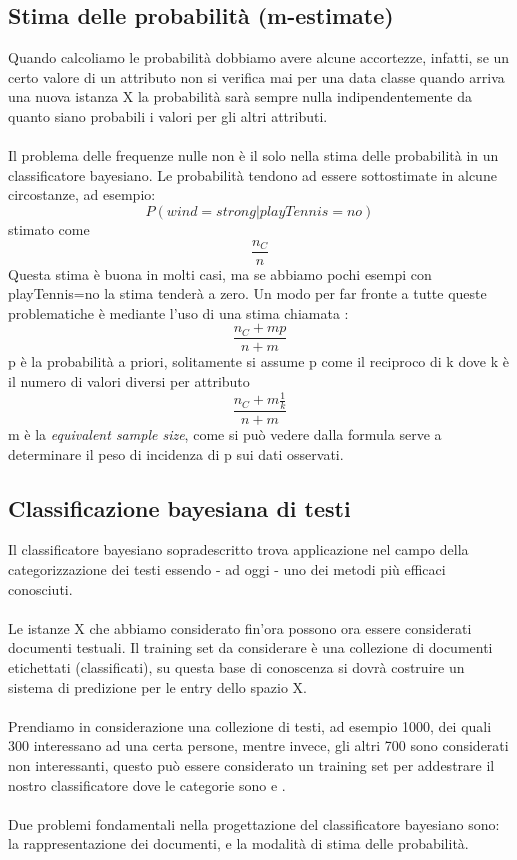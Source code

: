\documentclass{article}
\theoremstyle{plain}
\theoremstyle{definition}
\begin{document}
\subsection{Stima delle probabilità (m-estimate)}
Quando calcoliamo le probabilità dobbiamo avere alcune accortezze, infatti, se un certo valore di un attributo non si verifica mai per una data classe quando arriva una nuova istanza X la probabilità sarà sempre nulla indipendentemente da quanto siano probabili i valori per gli altri attributi. 
\\
\\
Il problema delle frequenze nulle non è il solo nella stima delle probabilità in un classificatore bayesiano. Le probabilità tendono ad essere sottostimate in alcune circostanze, ad esempio:
$$P(wind=strong|playTennis=no)$$ stimato come $$\frac{n_C}{n}$$
Questa stima è buona in molti casi, ma se abbiamo pochi esempi con playTennis=no la stima tenderà a zero.
Un modo per far fronte a tutte queste problematiche è mediante l'uso di una stima chiamata :
$$\frac{n_C+mp}{n+m}$$
p è la probabilità a priori, solitamente si assume p come il reciproco di k dove k è il numero di valori diversi per attributo
$$\frac{n_C+m\frac{1}{k}}{n+m}$$
m è la \textit{equivalent sample size}, come si può vedere dalla formula serve a determinare il peso di incidenza di p sui dati osservati. 

\subsection{Classificazione bayesiana di testi }
Il classificatore bayesiano sopradescritto trova applicazione nel campo della categorizzazione dei testi essendo - ad oggi - uno dei metodi più efficaci conosciuti.
\footnotemark
{}
\\
\\
Le istanze X che abbiamo considerato fin'ora possono ora essere considerati documenti testuali. Il training set da considerare è una collezione di documenti etichettati (classificati), su questa base di conoscenza si dovrà costruire un sistema di predizione per le entry dello spazio X.
\\
\\
Prendiamo in considerazione una collezione di testi, ad esempio 1000, dei quali 300 interessano ad una certa persone, mentre invece, gli altri 700 sono considerati non interessanti, questo può essere considerato un training set per addestrare il nostro classificatore dove le categorie sono  e .
\\
\\
Due problemi fondamentali nella progettazione del classificatore bayesiano sono: la rappresentazione dei documenti, e la modalità di stima delle probabilità.
\end{document}
